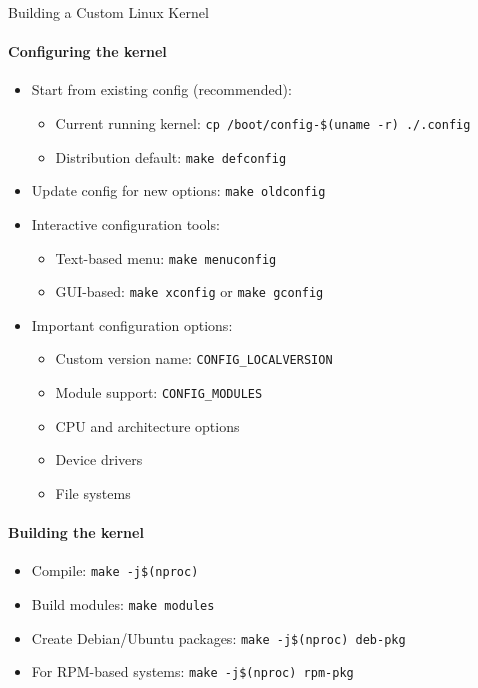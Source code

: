 \begin{KR}{Building a Custom Linux Kernel}
    \paragraph{Configuring the kernel}
    \begin{itemize}
        \item Start from existing config (recommended):
            \begin{itemize}
                \item Current running kernel: \texttt{cp /boot/config-\$(uname -r) ./.config}
                \item Distribution default: \texttt{make defconfig}
            \end{itemize}
        \item Update config for new options: \texttt{make oldconfig}
        \item Interactive configuration tools:
            \begin{itemize}
                \item Text-based menu: \texttt{make menuconfig}
                \item GUI-based: \texttt{make xconfig} or \texttt{make gconfig}
            \end{itemize}
        \item Important configuration options:
            \begin{itemize}
                \item Custom version name: \texttt{CONFIG\_LOCALVERSION}
                \item Module support: \texttt{CONFIG\_MODULES}
                \item CPU and architecture options
                \item Device drivers
                \item File systems
            \end{itemize}
    \end{itemize}
    
    \paragraph{Building the kernel}
    \begin{itemize}
        \item Compile: \texttt{make -j\$(nproc)}
        \item Build modules: \texttt{make modules}
        \item Create Debian/Ubuntu packages: \texttt{make -j\$(nproc) deb-pkg}
        \item For RPM-based systems: \texttt{make -j\$(nproc) rpm-pkg}
    \end{itemize}
    

\end{KR}
